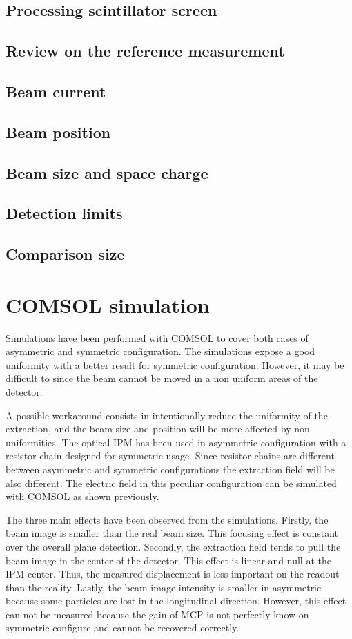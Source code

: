 \begin{refsection}
  \subsection{Processing scintillator screen}
  \subsection{Review on the reference measurement}



  \subsection{Beam current}
  \subsection{Beam position}
  \subsection{Beam size and space charge}
  \subsection{Detection limits}
  \subsection{Comparison size}

  \section{COMSOL simulation}
  Simulations have been performed with COMSOL to cover both cases of asymmetric and symmetric configuration. The simulations expose a good uniformity with a  better result for symmetric configuration. However, it may be difficult to since the beam cannot be moved in a non uniform areas of the detector.
  
  A possible workaround consists in intentionally reduce the uniformity of the extraction, and the beam size and position will be more affected by non-uniformities. The optical IPM has been used in asymmetric configuration with a resistor chain designed for symmetric usage. Since resistor chains are different between asymmetric and symmetric configurations the extraction field will be also different. The electric field in this peculiar configuration can be simulated with COMSOL as shown previously.

  The three main effects have been observed from the simulations. Firstly, the beam image is smaller than the real beam size. This focusing effect is constant over the overall plane detection. Secondly, the extraction field tends to pull the beam image in the center of the detector. This effect is linear and null at the IPM center. Thus, the measured displacement is less important on the readout than the reality. Lastly, the beam image intensity is smaller in asymmetric because some particles are lost in the longitudinal direction. However, this effect can not be measured because the gain of MCP is not perfectly know on symmetric configure and cannot be recovered correctly.
  

\end{refsection}
